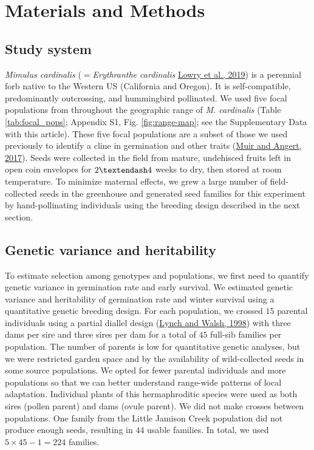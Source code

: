 \documentclass[
  12pt,
]{article}
\begin{document}
\hypertarget{materials-and-methods}{%
\section{Materials and Methods}\label{materials-and-methods}}

\hypertarget{study-system}{%
\subsection{Study system}\label{study-system}}

\emph{Mimulus cardinalis} (\(=\)\emph{Erythranthe cardinalis} \protect\hyperlink{ref-lowry_case_2019}{Lowry et al., 2019}) is a perennial forb native to the Western US (California and Oregon). It is self-compatible, predominantly outcrossing, and hummingbird pollinated. We used five focal populations from throughout the geographic range of \emph{M. cardinalis} (Table \ref{tab:focal_pops}; Appendix S1, Fig. \ref{fig:range-map}; see the Supplementary Data with this article). These five focal populations are a subset of those we used previously to identify a cline in germination and other traits (\protect\hyperlink{ref-muir_grow_2017}{Muir and Angert, 2017}). Seeds were collected in the field from mature, undehisced fruits left in open coin envelopes for \(2 \textendash 4\) weeks to dry, then stored at room temperature. To minimize maternal effects, we grew a large number of field-collected seeds in the greenhouse and generated seed families for this experiment by hand-pollinating individuals using the breeding design described in the next section.

\hypertarget{genetic-variance-and-heritability}{%
\subsection{Genetic variance and heritability}\label{genetic-variance-and-heritability}}

To estimate selection among genotypes and populations, we first need to quantify genetic variance in germination rate and early survival. We estimated genetic variance and heritability of germination rate and winter survival using a quantitative genetic breeding design. For each population, we crossed \(15\) parental individuals using a partial diallel design (\protect\hyperlink{ref-lynch_genetics_1998}{Lynch and Walsh, 1998}) with three dams per sire and three sires per dam for a total of \(45\) full-sib families per population. The number of parents is low for quantitative genetic analyses, but we were restricted garden space and by the availability of wild-collected seeds in some source populations. We opted for fewer parental individuals and more populations so that we can better understand range-wide patterns of local adaptation. Individual plants of this hermaphroditic species were used as both sires (pollen parent) and dams (ovule parent). We did not make crosses between populations. One family from the Little Jamison Creek population did not produce enough seeds, resulting in \(44\) usable families. In total, we used \(5 \times 45 - 1 = 224\) families.
\end{document}
